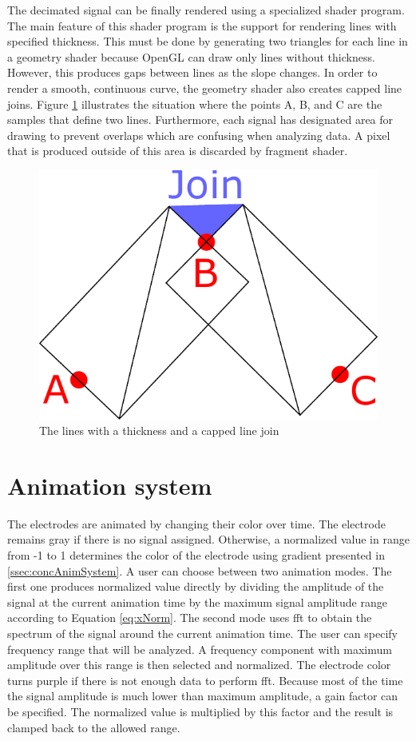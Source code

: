 The decimated signal can be finally rendered using a specialized shader program. The main feature of this shader program is the support for rendering lines with specified thickness. This must be done by generating two triangles for each line in a geometry shader because OpenGL can draw only lines without thickness. However, this produces gaps between lines as the slope changes. In order to render a smooth, continuous curve, the geometry shader also creates capped line joins. Figure \ref{fig:LinesAndJoin} illustrates the situation where the points A, B, and C are the samples that define two lines. Furthermore, each signal has designated area for drawing to prevent overlaps which are confusing when analyzing data. A pixel that is produced outside of this area is discarded by fragment shader.

\begin{figure}[htb]
	\centering
	\includegraphics[width=0.6\linewidth, height=0.2\textheight]{fig/linesAndJoin.pdf}
	\caption{The lines with a thickness and a capped line join}
	\label{fig:LinesAndJoin}
\end{figure}

\section{Animation system}
\label{sec:animSystem}
The electrodes are animated by changing their color over time. The electrode remains gray if there is no signal assigned. Otherwise, a normalized value in range from -1 to 1 determines the color of the electrode using gradient presented in \ref{ssec:concAnimSystem}. A user can choose between two animation modes. The first one produces normalized value directly by dividing the amplitude of the signal at the current animation time by the maximum signal amplitude range according to Equation \ref{eq:xNorm}. The second mode uses \gls{fft} to obtain the spectrum of the signal around the current animation time. The user can specify frequency range that will be analyzed. A frequency component with maximum amplitude over this range is then selected and normalized. The electrode color turns purple if there is not enough data to perform \gls{fft}. Because most of the time the signal amplitude is much lower than maximum amplitude, a gain factor can be specified. The normalized value is multiplied by this factor and the result is clamped back to the allowed range.

